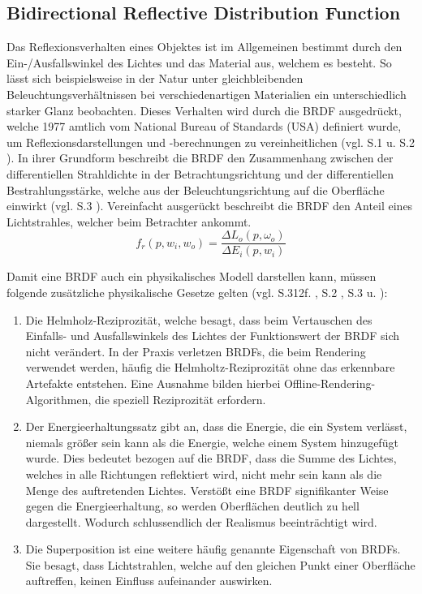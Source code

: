 \documentclass[
  11pt,
  a4paper,
  oneside
  ]{article}
\begin{document}
\subsection{Bidirectional Reflective Distribution Function}
Das Reflexionsverhalten eines Objektes ist im Allgemeinen bestimmt durch den Ein-/Ausfallswinkel des Lichtes und das Material aus, welchem es besteht. So lässt sich beispielsweise in der Natur unter gleichbleibenden Beleuchtungsverhältnissen bei verschiedenartigen Materialien ein unterschiedlich starker Glanz beobachten. Dieses Verhalten wird durch die BRDF ausgedrückt, welche 1977 amtlich vom National Bureau of Standards (USA) definiert wurde, um Reflexionsdarstellungen und -berechnungen zu vereinheitlichen 
(vgl. S.1 \cite{irrlichtOrg} u. S.2 \cite{uniUlm}). In ihrer Grundform beschreibt die BRDF den Zusammenhang zwischen der differentiellen Strahldichte in der Betrachtungsrichtung und der differentiellen Bestrahlungsstärke, welche aus der Beleuchtungsrichtung auf die Oberfläche einwirkt 
(vgl. S.3 \cite{irrlichtOrg}). Vereinfacht ausgerückt beschreibt die BRDF den Anteil eines Lichtstrahles, welcher beim Betrachter ankommt.
\begin{equation}
  f_{r}\left( p,w_{i},w_{o}\right) =\dfrac{\Delta L_{o}\left( p,\omega _{o}\right) }{\Delta E_{i}\left( p,w_{i}\right) }
\end{equation}

Damit eine BRDF auch ein physikalisches Modell darstellen kann, müssen folgende zusätz\-liche physikalische Gesetze gelten 
(vgl. S.312f. \cite{realTimeRendering4th}, S.2 \cite{uniUlm}, S.3 \cite{irrlichtOrg} u. \cite{learnOpenGL}): 
\begin{enumerate}
  \item Die Helmholz-Reziprozität, welche besagt, dass beim Vertauschen des Einfalls- und Ausfallswinkels des Lichtes der Funktionswert der BRDF sich nicht verändert. In der Praxis verletzen BRDFs, die beim Rendering verwendet werden, häufig die Helmholtz-Reziprozität ohne das erkennbare Artefakte entstehen. Eine Ausnahme bilden hierbei Offline-Rendering-Algorithmen, die speziell Reziprozität erfordern. 
  \item Der Energieerhaltungssatz gibt an, dass die Energie, die ein System verlässt, niemals größer sein kann als die Energie, welche einem System hinzugefügt wurde. Dies bedeutet bezogen auf die BRDF, dass die Summe des Lichtes, welches in alle Richtungen reflektiert wird, nicht mehr sein kann als die Menge des auftretenden Lichtes. Verstößt eine BRDF signifikanter Weise gegen die Energieerhaltung, so werden Oberflächen deutlich zu hell dargestellt. Wodurch schlussendlich der Realismus beeinträchtigt wird. 
  \item Die Superposition ist eine weitere häufig genannte Eigenschaft von BRDFs. Sie besagt, dass Lichtstrahlen, welche auf den gleichen Punkt einer Oberfläche auftreffen, keinen Einfluss aufeinander auswirken. 
\end{enumerate} 
\end{document}
